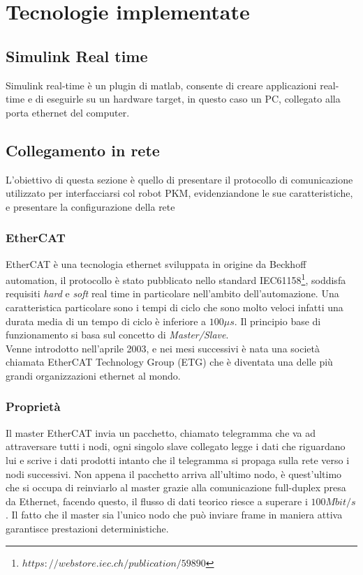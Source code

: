 \section{Tecnologie implementate}
\subsection{Simulink Real time}
Simulink real-time è un plugin di matlab, consente di creare applicazioni real-time e di eseguirle su un hardware target, in questo caso un PC, collegato alla porta ethernet del computer.
\subsection{Collegamento in rete}
L'obiettivo di questa sezione è quello di presentare il protocollo di comunicazione utilizzato per interfacciarsi col robot PKM, evidenziandone le sue caratteristiche, e presentare la configurazione della rete
\subsubsection{EtherCAT}
EtherCAT è una tecnologia ethernet sviluppata in origine da Beckhoff automation, il protocollo è stato pubblicato nello standard IEC61158\footnote{${https://webstore.iec.ch/publication/59890}$}, soddisfa requisiti \textit{hard} e \textit{soft} real time in particolare nell'ambito dell'automazione. Una caratteristica particolare sono i tempi di ciclo che sono molto veloci infatti una durata media di un tempo di ciclo è inferiore a $100 \mu s$. Il principio base di funzionamento si basa sul concetto di \textit{Master/Slave}.
\\Venne introdotto nell'aprile 2003, e nei mesi successivi è nata una società chiamata EtherCAT Technology Group (ETG) che è diventata una delle più grandi organizzazioni ethernet al mondo.
\subsubsection{Proprietà}
Il master EtherCAT invia un pacchetto, chiamato telegramma che va ad attraversare tutti i nodi, ogni singolo slave collegato legge i dati che riguardano lui e scrive i dati prodotti intanto che il telegramma si propaga sulla rete verso i nodi successivi. Non appena il pacchetto arriva all'ultimo nodo, è quest'ultimo che si occupa di reinviarlo al master grazie alla comunicazione full-duplex presa da Ethernet, facendo questo, il flusso di dati teorico riesce a superare i $100 Mbit/s$. Il fatto che il master sia l'unico nodo che può inviare frame in maniera attiva garantisce prestazioni deterministiche.  


